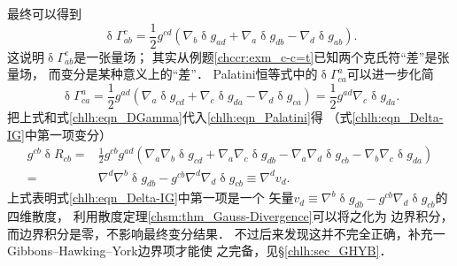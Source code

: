 最终可以得到
\begin{equation}\label{chlh:eqn_DGamma}
    \updelta \Gamma_{ab}^c= \frac{1}{2} g^{cd} \left(  \nabla_b \updelta g_{ad}
     + \nabla_a \updelta g_{db} - \nabla_d \updelta g_{ab} \right) .
\end{equation}
这说明$\updelta \Gamma_{ab}^c$是一张量场；
其实从例题\ref{chccr:exm_c-c=t}已知两个克氏符“差”是张量场，
而变分是某种意义上的“差”．
Palatini恒等式中的$\updelta\Gamma_{ca}^{a}$可以进一步化简
\begin{equation}
    \updelta\Gamma_{ca}^{a} = \frac{1}{2}g^{ad}\left( \nabla_a \updelta g_{cd}
    + \nabla_c \updelta g_{da} - \nabla_d \updelta g_{ca} \right)
    =\frac{1}{2}g^{ad} \nabla_c \updelta g_{da} .
\end{equation}
把上式和式\eqref{chlh:eqn_DGamma}代入\eqref{chlh:eqn_Palatini}得
（式\eqref{chlh:eqn_Delta-IG}中第一项变分）
\begin{equation}\label{chlh:eqn_hab}
\begin{aligned}
    g^{cb}\updelta R_{cb} =& \frac{1}{2}g^{cb} g^{ad}\left( \nabla_a \nabla_b \updelta g_{cd}
    + \nabla_a\nabla_c \updelta g_{db} - \nabla_a\nabla_d \updelta g_{cb}
    - \nabla_b\nabla_c \updelta g_{da}  \right) \\
    =&\nabla^d\nabla^b \updelta g_{db} - g^{cb} \nabla^d\nabla_d \updelta g_{cb}
    \equiv  \nabla^d v_d .
\end{aligned}
\end{equation}
上式表明式\eqref{chlh:eqn_Delta-IG}中第一项是一个
矢量$v_d\equiv \nabla^b \updelta g_{db} - g^{cb} \nabla_d \updelta g_{cb}$的四维散度，
利用散度定理\ref{chsm:thm_Gauss-Divergence}可以将之化为
边界积分，而边界积分是零，不影响最终变分结果．
不过后来发现这并不完全正确，补充一Gibbons--Hawking--York边界项才能使
之完备，见\S\ref{chlh:sec_GHYB}．


